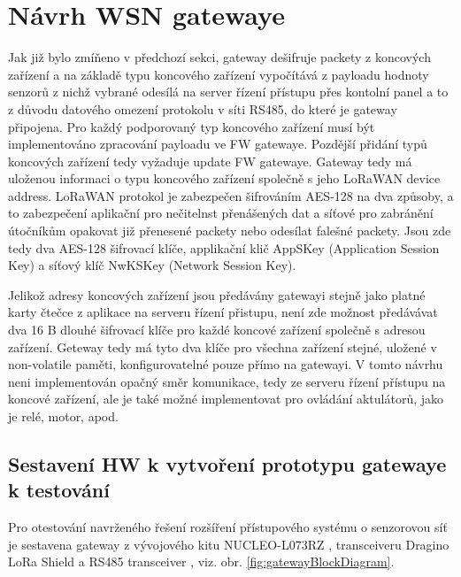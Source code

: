 \section{Návrh WSN gatewaye}
Jak již bylo zmíňeno v předchozí sekci, gateway dešifruje packety z koncových zařízení a na základě typu koncového zařízení vypočítává z payloadu hodnoty senzorů z nichž vybrané odesílá na server řízení přístupu přes kontolní panel a to z důvodu datového omezení protokolu v síti RS485, do které je gateway připojena.
Pro každý podporovaný typ koncového zařízení musí být implementováno zpracování payloadu ve FW gatewaye. Pozdější přidání typů koncových zařízení tedy vyžaduje update FW gatewaye.
Gateway tedy má uloženou informaci o typu koncového zařízení společně s jeho LoRaWAN device address.
LoRaWAN protokol je zabezpečen šifrováním AES-128 na dva způsoby, a to zabezpečení aplikační pro nečitelnst přenášených dat a síťové pro zabránění útočníkům opakovat již přenesené packety nebo odesílat falešné packety. Jsou zde tedy dva AES-128 šifrovací klíče, applikační klič AppSKey (Application Session Key) a síťový klíč NwKSKey (Network Session Key).

Jelikož adresy koncových zařízení jsou předávány gatewayi stejně jako platné karty čtečce z aplikace na serveru řízení přistupu, není zde možnost předávávat dva 16 B dlouhé šifrovací klíče pro každé koncové zařízení společně s adresou zařízení. Geteway tedy má tyto dva klíče pro všechna zařízení stejné, uložené v non-volatile paměti, konfigurovatelné pouze přímo na gatewayi.
V tomto návrhu neni implementován opačný směr komunikace, tedy ze serveru řízení přístupu na koncové zařízení, ale je také možné implementovat pro ovládání aktulátorů, jako je relé, motor, apod.



\subsection{Sestavení HW k vytvoření prototypu gatewaye k testování}
Pro otestování navrženého řešení rozšíření přístupového systému o senzorovou síť je sestavena gateway z vývojového kitu NUCLEO-L073RZ \cite{nucleoST}, transceiveru Dragino LoRa Shield \cite{RFM95w} a RS485 transceiver \cite{rs485tr}, viz. obr. \ref{fig:gatewayBlockDiagram}.

